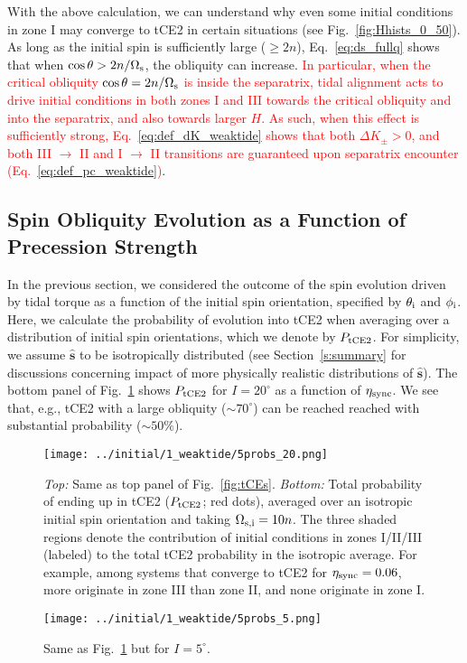 \documentclass[
        fleqn,
        usenatbib,
        referee
    ]{mnras}
\newcommand*{\uv}[1]{\hat{\boldsymbol{\mathbf{#1}}}}
\newlength{\colummwidth}
\begin{document}
With the above calculation, we can understand why even some initial conditions
in zone I may converge to tCE2 in certain situations (see
Fig.~\ref{fig:Hhists_0_50}). As long as the initial spin is sufficiently large
($\geq 2n$), Eq.~\eqref{eq:ds_fullq} shows that when $\cos \theta > 2n /
\Omega_{\rm s}$, the obliquity can increase. \textcolor{red}{In particular, when
the critical obliquity $\cos \theta = 2n / \Omega_{\rm s}$ is inside the
separatrix, tidal alignment acts to drive initial conditions in both zones I and
III towards the critical obliquity and into the separatrix, and also towards
larger $H$. As such, when this effect is sufficiently strong,
Eq.~\eqref{eq:def_dK_weaktide} shows that both $\Delta K_\pm > 0$, and both III
$\to$ II and I $\to$ II transitions are guaranteed upon separatrix encounter
(Eq.~\ref{eq:def_pc_weaktide})}.

\subsection{Spin Obliquity Evolution as a Function of Precession Strength
}\label{ss:tce2_etasync}

In the previous section, we considered the outcome of the spin evolution driven
by tidal torque as a function of the initial spin orientation, specified by
$\theta_{\rm i}$ and $\phi_{\rm i}$. Here, we calculate the probability of
evolution into tCE2 when averaging over a distribution of initial spin
orientations, which we denote by $P_{\rm tCE2}$. For simplicity, we assume
$\uv{s}$ to be isotropically distributed (see Section~\ref{s:summary} for
discussions concerning impact of more physically realistic distributions of
$\uv{s}$). The bottom panel of Fig.~\ref{fig:probs20} shows $P_{\rm tCE2}$ for
$I = 20^\circ$ as a function of $\eta_{\rm sync}$. We see that, e.g., tCE2 with
a large obliquity ($\sim 70^\circ$) can be reached reached with substantial
probability ($\sim 50\%$).
\begin{figure}
    \centering
    \texttt{[image: ../initial/1\_weaktide/5probs\_20.png]}
    \caption{\emph{Top:} Same as top panel of Fig.~\ref{fig:tCEs}.
    \emph{Bottom:} Total probability of ending up in tCE2 ($P_{\rm tCE2}$; red
    dots), averaged over an isotropic initial spin orientation and taking
    $\Omega_{\rm s, i} = 10n$. The three shaded regions denote the contribution
    of initial conditions in zones I/II/III (labeled) to the total tCE2
    probability in the isotropic average. For example, among systems that
    converge to tCE2 for $\eta_{\rm sync} = 0.06$, more originate in zone III
    than zone II, and none originate in zone I.}\label{fig:probs20}
\end{figure}
\begin{figure}
    \centering
    \texttt{[image: ../initial/1\_weaktide/5probs\_5.png]}
    \caption{Same as Fig.~\ref{fig:probs20} but for $I =
    5^\circ$.}\label{fig:probs5}
\end{figure}
\end{document}
